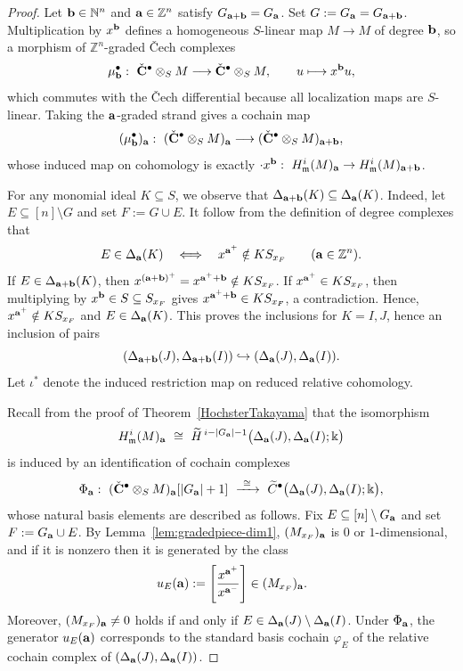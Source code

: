 \documentclass[12pt]{amsart}
\numberwithin{equation}{section}
\theoremstyle{definition}
\theoremstyle{definition}
\newcommand{\ZZ}{{\mathbb Z}}
\newcommand{\NN}{{\mathbb N}}
\def\kk{{\Bbbk}}
\def\mm{{\mathfrak m}}
\def\a{{\bold a}}
\def\b{{\bold b}}
\begin{document}
\begin{proof}
	Let $\b\in\NN^n$ and $\a\in\ZZ^n$ satisfy $G_{\a+\b}=G_\a$. Set $G:=G_\a=G_{\a+\b}$.
	Multiplication by $x^\b$ defines a homogeneous $S$-linear map $M\to M$ of degree $\b$, so a morphism of
	$\ZZ^n$-graded \v{C}ech complexes
	\[
	\mu_\b^\bullet:\ \Check{\bf C}^\bullet\otimes_S M \longrightarrow \Check{\bf C}^\bullet\otimes_S M,
	\qquad
	u\longmapsto x^\b u,
	\]
	which commutes with the \v{C}ech differential because all localization maps are $S$-linear. Taking the $\a$-graded
	strand gives a cochain map
	\[
	(\mu_\b^\bullet)_\a:\ (\Check{\bf C}^\bullet\otimes_S M)_\a \longrightarrow (\Check{\bf C}^\bullet\otimes_S M)_{\a+\b},
	\]
	whose induced map on cohomology is exactly $\cdot x^\b:\ H^i_\mm(M)_\a\to H^i_\mm(M)_{\a+\b}$.
	
	For any monomial ideal $K \subseteq S$, we observe that $\Delta_{\a+\b}(K)\subseteq \Delta_\a(K)$.
	Indeed, let $E\subseteq[n]\setminus G$ and set $F:=G\cup E$. It follow from the definition of degree complexes that
	\[
	E\in\Delta_{\a}(K)\quad\Longleftrightarrow\quad x^{\a^+}\notin K S_{x_F}\qquad(\a\in\ZZ^n).
	\]
	If $E\in\Delta_{\a+\b}(K)$, then $x^{(\a+\b)^+}=x^{\a^++\b}\notin K S_{x_F}$. If $x^{\a^+}\in K S_{x_F}$, then multiplying
	by $x^\b\in S\subseteq S_{x_F}$ gives $x^{\a^++\b}\in K S_{x_F}$, a contradiction. Hence, $x^{\a^+}\notin K S_{x_F}$ and
	$E\in\Delta_\a(K)$. This proves the inclusions for $K=I,J$, hence an inclusion of pairs
	\[
	(\Delta_{\a+\b}(J),\Delta_{\a+\b}(I))\hookrightarrow (\Delta_\a(J),\Delta_\a(I)).
	\]
	Let $\iota^\ast$ denote the induced restriction map on reduced relative cohomology.
	
	Recall from the proof of Theorem~\ref{HochsterTakayama} that the isomorphism
	\[
	H^i_\mm(M)_\a\ \cong\ \widetilde H^{\,i-|G_\a|-1}\big(\Delta_\a(J),\Delta_\a(I);\kk\big)
	\]
	is induced by an identification of cochain complexes
	\[
	\Phi_\a:\ (\Check{\bf C}^\bullet\otimes_S M)_\a[|G_\a|+1]\ \xrightarrow{\ \cong\ }\
	\widetilde C^\bullet\big(\Delta_\a(J),\Delta_\a(I);\kk\big),
	\]
	whose natural basis elements are described as follows.
	Fix $E\subseteq[n]\setminus G_\a$ and set $F:=G_\a\cup E$. By Lemma~\ref{lem:gradedpiece-dim1},
	$(M_{x_F})_\a$ is $0$ or $1$-dimensional, and if it is nonzero then it is generated by the class
	\[
	u_E(\a):=\left[\frac{x^{\a^+}}{x^{\a^-}}\right]\in (M_{x_F})_\a.
	\]
	Moreover, $(M_{x_F})_\a\neq 0$ holds if and only if $E\in\Delta_\a(J)\setminus\Delta_\a(I)$.
	Under $\Phi_\a$, the generator $u_E(\a)$ corresponds to the standard basis cochain $\varphi_E$ of the relative
	cochain complex of $(\Delta_\a(J),\Delta_\a(I))$.
	

\end{proof}
\end{document}
